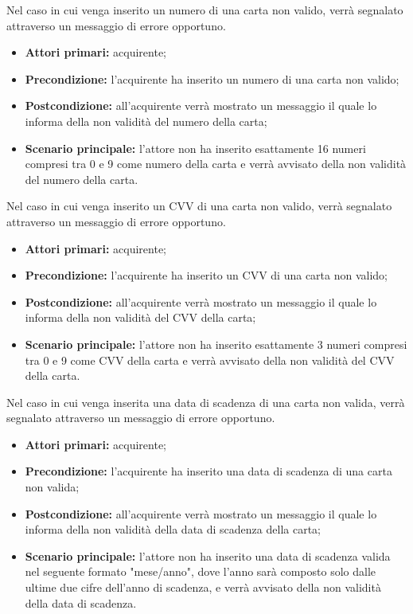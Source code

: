 Nel caso in cui venga inserito un numero di una carta non valido, verrà segnalato attraverso un messaggio di errore opportuno.
\begin{itemize}
	\item \textbf{Attori primari:} acquirente;
	\item \textbf{Precondizione:} l'acquirente ha inserito un numero di una carta non valido;
	\item \textbf{Postcondizione:} all'acquirente verrà mostrato un messaggio il quale lo informa della non validità del numero della carta;
	\item \textbf{Scenario principale:} l'attore non ha inserito esattamente 16 numeri compresi tra 0 e 9 come numero della carta e verrà avvisato della non validità del numero della carta.
\end{itemize}

Nel caso in cui venga inserito un CVV di una carta non valido, verrà segnalato attraverso un messaggio di errore opportuno.
\begin{itemize}
	\item \textbf{Attori primari:} acquirente;
	\item \textbf{Precondizione:} l'acquirente ha inserito un CVV di una carta non valido;
	\item \textbf{Postcondizione:} all'acquirente verrà mostrato un messaggio il quale lo informa della non validità del CVV della carta;
	\item \textbf{Scenario principale:} l'attore non ha inserito esattamente 3 numeri compresi tra 0 e 9 come CVV della carta e verrà avvisato della non validità del CVV della carta.
\end{itemize}

Nel caso in cui venga inserita una data di scadenza di una carta non valida, verrà segnalato attraverso un messaggio di errore opportuno.
\begin{itemize}
	\item \textbf{Attori primari:} acquirente;
	\item \textbf{Precondizione:} l'acquirente ha inserito una data di scadenza di una carta non valida;
	\item \textbf{Postcondizione:} all'acquirente verrà mostrato un messaggio il quale lo informa della non validità della data di scadenza della carta;
	\item \textbf{Scenario principale:} l'attore non ha inserito una data di scadenza valida nel seguente formato "mese/anno", dove l'anno sarà composto solo dalle ultime due cifre dell'anno di scadenza, e verrà avvisato della non validità della data di scadenza.
\end{itemize}

